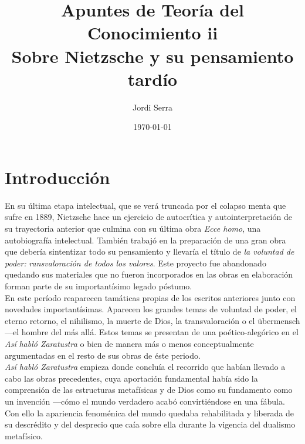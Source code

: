 \documentclass[a4paper, 10pt, twocolumn, spanish]{article}
\author{Jordi Serra}
\date{\today}
\title{Apuntes de Teoría del Conocimiento ii\\\medskip
\large Sobre Nietzsche y su pensamiento tardío}
\begin{document}
\maketitle
\tableofcontents


\section{Introducción}
\label{sec:org646a026}
En su última etapa intelectual, que se verá truncada por el colapso
menta que sufre en 1889, Nietzsche hace un ejercicio de autocrítica y
autointerpretación de su trayectoria anterior que culmina con su
última obra \emph{Ecce homo}, una autobiografía intelectual. También
trabajó en la preparación de una gran obra que debería sintentizar
todo su pensamiento y llevaría el título de \emph{la voluntad de poder:}
\emph{ransvaloración de todos los valores}. Este proyecto fue abandonado
quedando sus materiales que no fueron incorporados en las obras en
elaboración forman parte de su importantísimo legado póstumo.\\[0pt]

En este período reaparecen tamáticas propias de los escritos
anteriores junto con novedades importantísimas. Aparecen los grandes
temas de voluntad de poder, el eterno retorno, el nihilismo, la muerte
de Dios, la transvaloración o el übermensch —el hombre del más
allá. Estos temas se presentan de una poético-alegórico en el \emph{Así}
\emph{habló Zaratustra} o bien de manera más o menos conceptualmente
argumentadas en el resto de sus obras de éste periodo.\\[0pt]

\emph{Así habló Zaratustra} empieza donde concluía el recorrido que habían
llevado a cabo las obras precedentes, cuya aportación fundamental
había sido la comprensión de las estructuras metafísicas y de Dios
como su fundamento como un invención —cómo el mundo verdadero acabó
convirtiéndose en una fábula.\\[0pt]

Con ello la apariencia fenoménica del mundo quedaba rehabilitada y
liberada de su descrédito y del desprecio que caía sobre ella durante
la vigencia del dualismo metafísico.\\[0pt]
\end{document}
